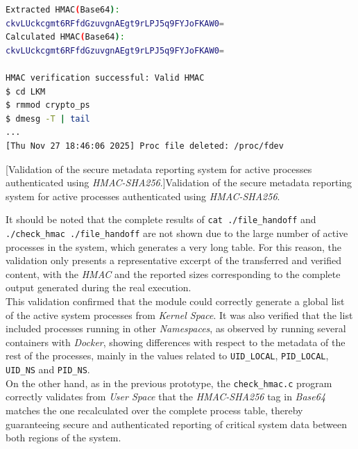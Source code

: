 \begin{lstlisting}[language=bash,basicstyle=\ttfamily\fontsize{5.6pt}{6.2pt}\selectfont,breaklines=false,columns=fullflexible,keepspaces=true]
Extracted HMAC(Base64):
ckvLUckcgmt6RFfdGzuvgnAEgt9rLPJ5q9FYJoFKAW0=
Calculated HMAC(Base64):
ckvLUckcgmt6RFfdGzuvgnAEgt9rLPJ5q9FYJoFKAW0=

HMAC verification successful: Valid HMAC
$ cd LKM
$ rmmod crypto_ps
$ dmesg -T | tail
...
[Thu Nov 27 18:46:06 2025] Proc file deleted: /proc/fdev
\end{lstlisting}
\captionsetup{type=code,justification=centering,singlelinecheck=false}
[Validation of the secure metadata reporting system for active processes authenticated using \textit{HMAC-SHA256}.]{Validation of the secure metadata reporting system for active processes authenticated using \textit{HMAC-SHA256}.}
\label{cod:report_validation}
\vspace{\baselineskip}

It should be noted that the complete results of \verb|cat ./file_handoff| and \verb|./check_hmac ./file_handoff| are not shown due to the large number of active processes in the system, which generates a very long table.
For this reason, the validation only presents a representative excerpt of the transferred and verified content, with the \textit{HMAC} and the reported sizes corresponding to the complete output generated during the real execution.\\

This validation confirmed that the module could correctly generate a global list of the active system processes from \textit{Kernel Space}.
It was also verified that the list included processes running in other \textit{Namespaces}, as observed by running several containers with \textit{Docker}, showing differences with respect to the metadata of the rest of the processes, mainly in the values related to \verb|UID_LOCAL|, \verb|PID_LOCAL|, \verb|UID_NS| and \verb|PID_NS|.\\

On the other hand, as in the previous prototype, the \verb|check_hmac.c| program correctly validates from \textit{User Space} that the \textit{HMAC-SHA256} tag in \textit{Base64} matches the one recalculated over the complete process table, thereby guaranteeing secure and authenticated reporting of critical system data between both regions of the system.\\
